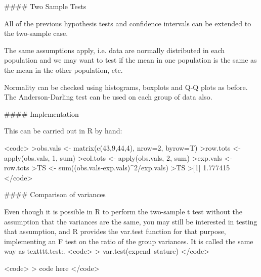 





#### {Two Sample Tests}


All of the previous hypothesis tests and confidence intervals can be
extended to the two-sample case.

The same assumptions apply, i.e. data are normally distributed in
each population and we may want to test if the mean in one
population is the same as the mean in the other population, etc.

Normality can be checked using histograms, boxplots and Q-Q
plots as before. The Anderson-Darling test can be used on
each group of data also.



#### {Implementation}

This can be carried out in R by hand:

 <code>
>obs.vals <- matrix(c(43,9,44,4), nrow=2, byrow=T)
>row.tots <- apply(obs.vals, 1, sum)
>col.tots <- apply(obs.vals, 2, sum)
>exp.vals <- row.tots%
>TS <- sum((obs.vals-exp.vals)^2/exp.vals)
>TS
>[1] 1.777415
 </code>





#### {Comparison of variances}


Even though it is possible in R to perform the two-sample t test without
the assumption that the variances are the same, you may still be interested
in testing that assumption, and R provides the var.test function for that
purpose, implementing an F test on the ratio of the group variances. It is
called the same way as texttt{t.test}:.
<code>
> var.test(expend~stature)
</code>

      
      

 <code>
> code here
 </code>
